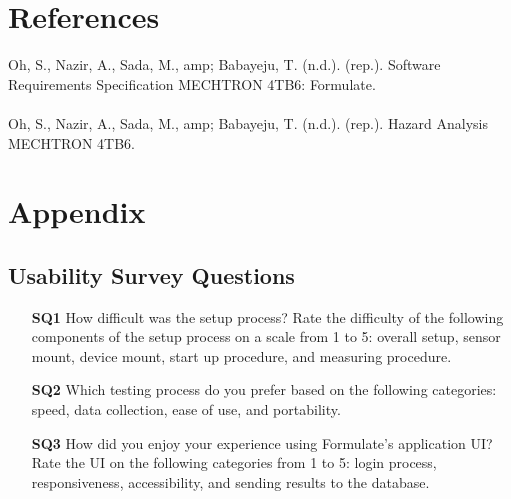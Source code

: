 \documentclass[12pt, titlepage]{article}
\begin{document}
  \newpage




				

\section{References}
Oh, S., Nazir, A., Sada, M., amp; Babayeju, T. (n.d.). (rep.). Software Requirements Specification MECHTRON 4TB6: Formulate. \\
\noindent \\
Oh, S., Nazir, A., Sada, M., amp; Babayeju, T. (n.d.). (rep.). Hazard Analysis MECHTRON 4TB6. \\


\section{Appendix}


\subsection{Usability Survey Questions}

\begin{enumerate}
  \item[\bf{SQ1}]{How difficult was the setup process? Rate the difficulty of the following components of the setup process on a scale from 1 to 5: overall setup, sensor mount, device mount, start up procedure, and measuring procedure. }
  
  \item[\bf{SQ2}]{Which testing process do you prefer based on the following categories: speed, data collection, ease of use, and portability. }
  
  \item[\bf{SQ3}]{How did you enjoy your experience using Formulate's application UI? Rate the UI on the following categories from 1 to 5: login process, responsiveness, accessibility, and sending results to the database.}

\end{enumerate}

\end{document}
